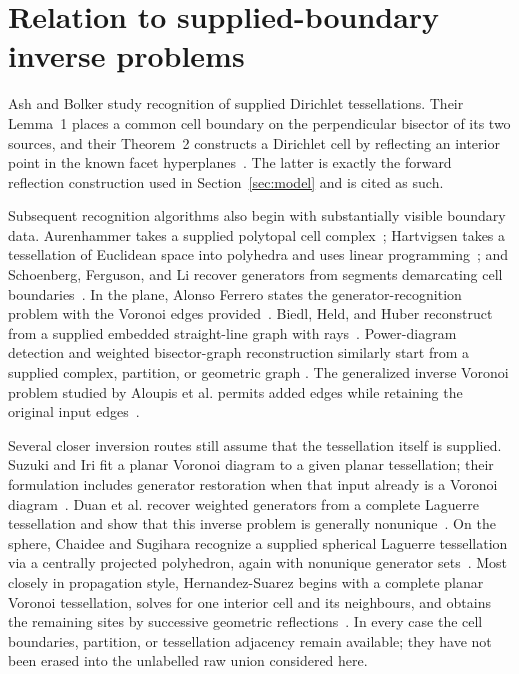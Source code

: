 \documentclass[11pt]{amsart}
\theoremstyle{definition}
\begin{document}
\section{Relation to supplied-boundary inverse problems}
\label{sec:related}

Ash and Bolker study recognition of supplied Dirichlet tessellations.  Their
Lemma~1 places a common cell boundary on the perpendicular bisector of its two
sources, and their Theorem~2 constructs a Dirichlet cell by reflecting an
interior point in the known facet hyperplanes~\cite{AshBolker1985}.  The latter
is exactly the forward reflection construction used in Section~\ref{sec:model}
and is cited as such.

Subsequent recognition algorithms also begin with substantially visible
boundary data.  Aurenhammer takes a supplied polytopal cell
complex~\cite{Aurenhammer1987}; Hartvigsen takes a tessellation of Euclidean
space into polyhedra and uses linear programming~\cite{Hartvigsen1992}; and
Schoenberg, Ferguson, and Li recover generators from segments demarcating cell
boundaries~\cite{SchoenbergFergusonLi2003}.  In the plane, Alonso Ferrero states
the generator-recognition problem with the Voronoi edges
provided~\cite{AlonsoFerrero2011}.  Biedl, Held, and Huber reconstruct from a
supplied embedded straight-line graph with rays~\cite{BiedlHeldHuber2013}.
Power-diagram detection and weighted bisector-graph reconstruction similarly
start from a supplied complex, partition, or geometric graph
\cite{BorgwardtFrongillo2017,EderEtAl2023}.  The generalized inverse Voronoi
problem studied by Aloupis et al. permits added edges while retaining the
original input edges~\cite{AloupisEtAl2013}.

Several closer inversion routes still assume that the tessellation itself is
supplied.  Suzuki and Iri fit a planar Voronoi diagram to a given planar
tessellation; their formulation includes generator restoration when that
input already is a Voronoi diagram~\cite{SuzukiIri1986}.  Duan et al. recover
weighted generators from a complete Laguerre tessellation and show that this
inverse problem is generally nonunique~\cite{DuanEtAl2014}.  On the sphere,
Chaidee and Sugihara recognize a supplied spherical Laguerre tessellation via
a centrally projected polyhedron, again with nonunique generator
sets~\cite{ChaideeSugihara2017}.  Most closely in propagation style,
Hernandez-Suarez begins with a complete planar Voronoi tessellation, solves for
one interior cell and its neighbours, and obtains the remaining sites by
successive geometric reflections~\cite{HernandezSuarez2025}.  In every case
the cell boundaries, partition, or tessellation adjacency remain available;
they have not been erased into the unlabelled raw union considered here.
\end{document}
